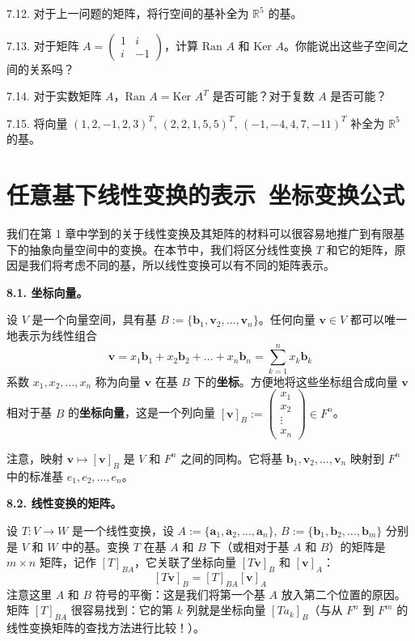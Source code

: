7.12. 对于上一问题的矩阵，将行空间的基补全为 $\mathbb{R}^5$ 的基。

7.13. 对于矩阵 $A = \begin{pmatrix} 1 & i \\ i & -1 \end{pmatrix}$，计算 $\text{Ran } A$ 和 $\text{Ker } A$。你能说出这些子空间之间的关系吗？

7.14. 对于实数矩阵 $A$，$\text{Ran } A = \text{Ker } A^T$ 是否可能？对于复数 $A$ 是否可能？

7.15. 将向量 $(1, 2, -1, 2, 3)^T$, $(2, 2, 1, 5, 5)^T$, $(-1, -4, 4, 7, -11)^T$ 补全为 $\mathbb{R}^5$ 的基。


\section{任意基下线性变换的表示~坐标变换公式}

我们在第 1 章中学到的关于线性变换及其矩阵的材料可以很容易地推广到有限基下的抽象向量空间中的变换。在本节中，我们将区分线性变换 $T$ 和它的矩阵，原因是我们将考虑不同的基，所以线性变换可以有不同的矩阵表示。

\textbf{8.1. 坐标向量。}

设 $V$ 是一个向量空间，具有基 $B := \{\mathbf{b}_1, \mathbf{v}_2, \dots, \mathbf{v}_n\}$。任何向量 $\mathbf{v} \in V$ 都可以唯一地表示为线性组合
$$
\mathbf{v} = x_1 \mathbf{b}_1 + x_2 \mathbf{b}_2 + \dots + x_n \mathbf{b}_n = \sum_{k=1}^n x_k \mathbf{b}_k
$$
系数 $x_1, x_2, \dots, x_n$ 称为向量 $\mathbf{v}$ 在基 $B$ 下的\textbf{坐标}。方便地将这些坐标组合成向量 $\mathbf{v}$ 相对于基 $B$ 的\textbf{坐标向量}，这是一个列向量 $[\mathbf{v}]_B := \begin{pmatrix} x_1 \\ x_2 \\ \vdots \\ x_n \end{pmatrix} \in F^n$。

注意，映射 $\mathbf{v} \mapsto [\mathbf{v}]_B$ 是 $V$ 和 $F^n$ 之间的同构。它将基 $\mathbf{b}_1, \mathbf{v}_2, \dots, \mathbf{v}_n$ 映射到 $F^n$ 中的标准基 $e_1, e_2, \dots, e_n$。

\textbf{8.2. 线性变换的矩阵。}

设 $T: V \to W$ 是一个线性变换，设 $A := \{\mathbf{a}_1, \mathbf{a}_2, \dots, \mathbf{a}_n\}$, $B := \{\mathbf{b}_1, \mathbf{b}_2, \dots, \mathbf{b}_m\}$ 分别是 $V$ 和 $W$ 中的基。变换 $T$ 在基 $A$ 和 $B$ 下（或相对于基 $A$ 和 $B$）的矩阵是 $m \times n$ 矩阵，记作 $[T]_{BA}$，它关联了坐标向量 $[T \mathbf{v}]_B$ 和 $[\mathbf{v}]_A$：
$$
[T \mathbf{v}]_B = [T]_{BA} [\mathbf{v}]_A
$$
注意这里 $A$ 和 $B$ 符号的平衡：这是我们将第一个基 $A$ 放入第二个位置的原因。矩阵 $[T]_{BA}$ 很容易找到：它的第 $k$ 列就是坐标向量 $[T a_k]_B$（与从 $F^n$ 到 $F^m$ 的线性变换矩阵的查找方法进行比较！）。

